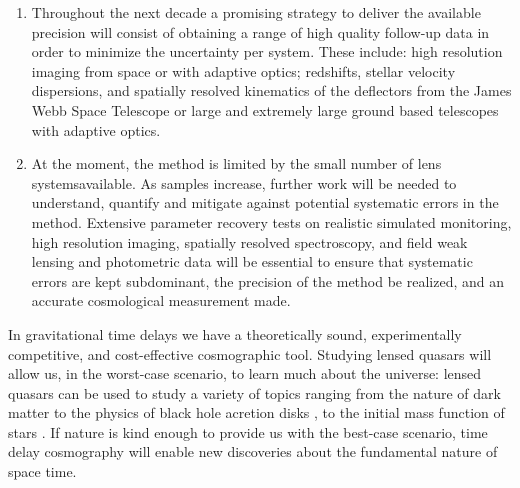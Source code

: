 \begin{enumerate}
%
\item Throughout the next decade a promising strategy to deliver the
available precision will consist of obtaining a range of high quality
follow-up data in order to minimize the uncertainty per system. These
include: high resolution imaging from space or with adaptive optics;
redshifts, stellar velocity dispersions, and spatially resolved
kinematics of the deflectors from the James Webb Space Telescope or
large and extremely large ground based telescopes with adaptive
optics.
%
%
\item  At the moment, the method is limited by the small number of lens
systemsavailable. As samples increase, further work will be needed to
understand, quantify and mitigate against potential systematic errors
in the method. Extensive parameter recovery tests on realistic
simulated monitoring, high resolution imaging, spatially resolved
spectroscopy, and field weak lensing and photometric data will be
essential to ensure that systematic errors are kept subdominant, the
precision of the method be realized, and an accurate cosmological
measurement made.
\end{enumerate}


In gravitational time delays we have a theoretically sound,
experimentally competitive, and cost-effective cosmographic tool.
Studying lensed quasars will allow us, in the worst-case scenario, to
learn much about the universe: lensed quasars can be used to study a
variety of topics ranging from the nature of dark matter
\citep{Metcalf:2005p1203,Xu++09,Veg++14,Nie++14} to the physics of
black hole acretion disks \citep{PMK08,Blackburne:2010p6600}, to the
initial mass function of stars \citep{Sch++14}. If nature is kind
enough to provide us with the best-case scenario, time delay
cosmography will enable new discoveries about the fundamental nature
of space time.
